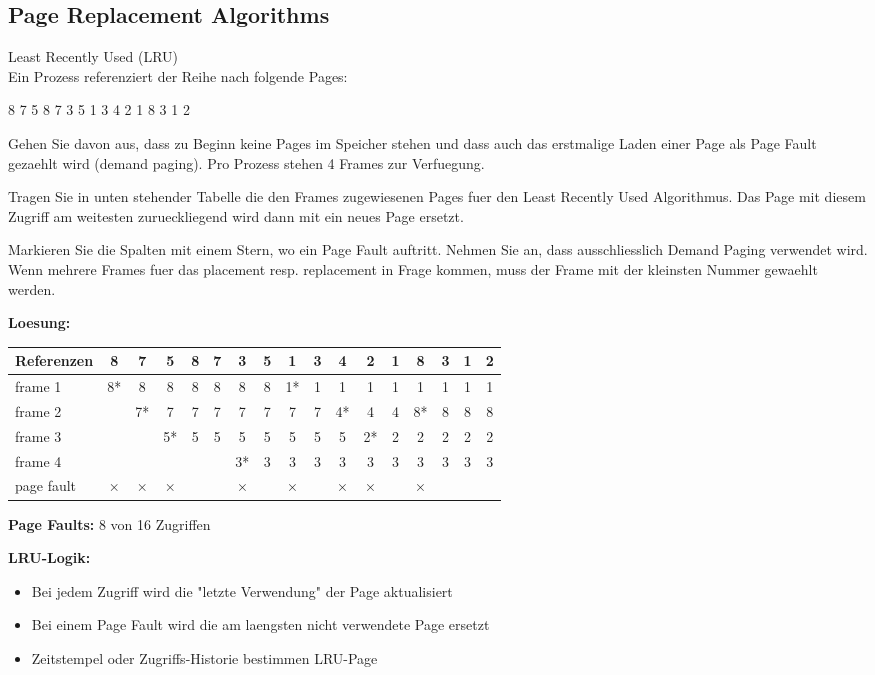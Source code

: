 \subsection{Page Replacement Algorithms}

\begin{example2}{Least Recently Used (LRU)}\\
    Ein Prozess referenziert der Reihe nach folgende Pages:
    \begin{center}
    8 7 5 8 7 3 5 1 3 4 2 1 8 3 1 2
    \end{center}
    
    Gehen Sie davon aus, dass zu Beginn keine Pages im Speicher stehen und dass auch das erstmalige Laden einer Page als Page Fault gezaehlt wird (demand paging). Pro Prozess stehen 4 Frames zur Verfuegung.
    
    Tragen Sie in unten stehender Tabelle die den Frames zugewiesenen Pages fuer den Least Recently Used Algorithmus. Das Page mit diesem Zugriff am weitesten zurueckliegend wird dann mit ein neues Page ersetzt.
    
    Markieren Sie die Spalten mit einem Stern, wo ein Page Fault auftritt. Nehmen Sie an, dass ausschliesslich Demand Paging verwendet wird. Wenn mehrere Frames fuer das placement resp. replacement in Frage kommen, muss der Frame mit der kleinsten Nummer gewaehlt werden.
    
    \tcblower
    
    \textbf{Loesung:}
    
    \begin{center}
    \begin{tabular}{|l|c|c|c|c|c|c|c|c|c|c|c|c|c|c|c|c|}
    \hline
    Referenzen & 8 & 7 & 5 & 8 & 7 & 3 & 5 & 1 & 3 & 4 & 2 & 1 & 8 & 3 & 1 & 2 \\
    \hline
    frame 1 & 8* & 8 & 8 & 8 & 8 & 8 & 8 & 1* & 1 & 1 & 1 & 1 & 1 & 1 & 1 & 1 \\
    \hline
    frame 2 & & 7* & 7 & 7 & 7 & 7 & 7 & 7 & 7 & 4* & 4 & 4 & 8* & 8 & 8 & 8 \\
    \hline
    frame 3 & & & 5* & 5 & 5 & 5 & 5 & 5 & 5 & 5 & 2* & 2 & 2 & 2 & 2 & 2 \\
    \hline
    frame 4 & & & & & & 3* & 3 & 3 & 3 & 3 & 3 & 3 & 3 & 3 & 3 & 3 \\
    \hline
    page fault & × & × & × & & & × & & × & & × & × & & × & & & \\
    \hline
    \end{tabular}
    \end{center}
    
    \textbf{Page Faults:} 8 von 16 Zugriffen
    
    \textbf{LRU-Logik:}
    \begin{itemize}
        \item Bei jedem Zugriff wird die "letzte Verwendung" der Page aktualisiert
        \item Bei einem Page Fault wird die am laengsten nicht verwendete Page ersetzt
        \item Zeitstempel oder Zugriffs-Historie bestimmen LRU-Page
    \end{itemize}
\end{example2}

